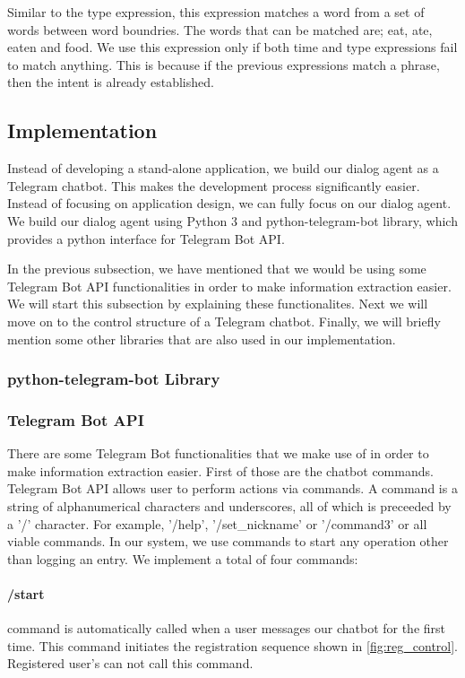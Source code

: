 Similar to the type expression, this expression matches a word from a set of words between word boundries.
The words that can be matched are; eat, ate, eaten and food.
We use this expression only if both time and type expressions fail to match anything.
This is because if the previous expressions match a phrase, then the intent is already established.

\subsection{Implementation}
Instead of developing a stand-alone application, we build our dialog agent as a Telegram chatbot.
This makes the development process significantly easier.
Instead of focusing on application design, we can fully focus on our dialog agent.
We build our dialog agent using Python 3 and python-telegram-bot library, which provides a python interface for Telegram Bot API.

In the previous subsection, we have mentioned that we would be using some Telegram Bot API functionalities in order to make information extraction easier. 
We will start this subsection by explaining these functionalites.
Next we will move on to the control structure of a Telegram chatbot.
Finally, we will briefly mention some other libraries that are also used in our implementation.
\subsubsection{python-telegram-bot Library}
\subsubsection{Telegram Bot API}
There are some Telegram Bot functionalities that we make use of in order to make information extraction easier.
First of those are the chatbot commands.
Telegram Bot API allows user to perform actions via commands.
A command is a string of alphanumerical characters and underscores, all of which is preceeded by a '/' character.
For example, '/help', '/set\_nickname' or '/command3' or all viable commands.
In our system, we use commands to start any operation other than logging an entry.
We implement a total of four commands:

\paragraph{/start} command is automatically called when a user messages our chatbot for the first time. This command initiates the registration sequence shown in \autoref{fig:reg_control}. Registered user's can not call this command.

